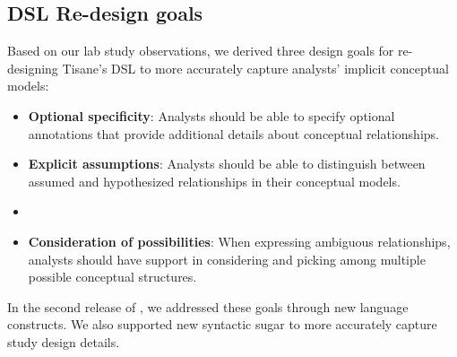 \subsection{DSL Re-design goals} \label{sec:rtisane_design_implications} 

Based on our lab study observations, we derived three design goals for
re-designing Tisane's DSL to more accurately capture analysts' implicit
conceptual models: 

\def\optionalSpecificity{\textbf{Optional specificity}\xspace}
\def\considerPossibilities{\textbf{Consideration of possibilities}\xspace}
\def\assumeHypothesize{\textbf{Explicit assumptions}\xspace}
\begin{itemize}
    \item \optionalSpecificity: Analysts should be able to specify optional annotations that provide
    additional details about conceptual relationships.
    \item \assumeHypothesize: Analysts should be able to distinguish between assumed and hypothesized relationships in their conceptual models. 
    \item \item \considerPossibilities: When expressing ambiguous relationships, analysts should have support
    in considering and picking among multiple possible conceptual structures.
\end{itemize}

In the second release of \tisane, we addressed these goals through new language
constructs. We also supported new syntactic sugar to more accurately capture
study design details. 

